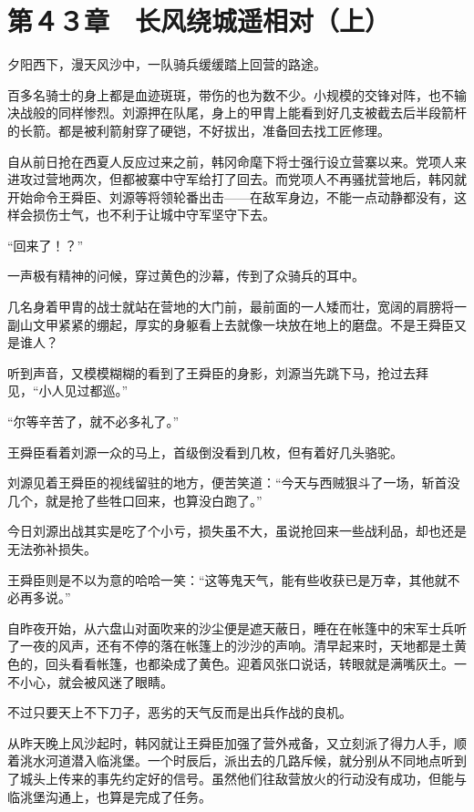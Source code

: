 \section{第４３章　长风绕城遥相对（上）}

夕阳西下，漫天风沙中，一队骑兵缓缓踏上回营的路途。

百多名骑士的身上都是血迹斑斑，带伤的也为数不少。小规模的交锋对阵，也不输决战般的同样惨烈。刘源押在队尾，身上的甲胄上能看到好几支被截去后半段箭杆的长箭。都是被利箭射穿了硬铠，不好拔出，准备回去找工匠修理。

自从前日抢在西夏人反应过来之前，韩冈命麾下将士强行设立营寨以来。党项人来进攻过营地两次，但都被寨中守军给打了回去。而党项人不再骚扰营地后，韩冈就开始命令王舜臣、刘源等将领轮番出击——在敌军身边，不能一点动静都没有，这样会损伤士气，也不利于让城中守军坚守下去。

“回来了！？”

一声极有精神的问候，穿过黄色的沙幕，传到了众骑兵的耳中。

几名身着甲胄的战士就站在营地的大门前，最前面的一人矮而壮，宽阔的肩膀将一副山文甲紧紧的绷起，厚实的身躯看上去就像一块放在地上的磨盘。不是王舜臣又是谁人？

听到声音，又模模糊糊的看到了王舜臣的身影，刘源当先跳下马，抢过去拜见，“小人见过都巡。”

“尔等辛苦了，就不必多礼了。”

王舜臣看着刘源一众的马上，首级倒没看到几枚，但有着好几头骆驼。

刘源见着王舜臣的视线留驻的地方，便苦笑道：“今天与西贼狠斗了一场，斩首没几个，就是抢了些牲口回来，也算没白跑了。”

今日刘源出战其实是吃了个小亏，损失虽不大，虽说抢回来一些战利品，却也还是无法弥补损失。

王舜臣则是不以为意的哈哈一笑：“这等鬼天气，能有些收获已是万幸，其他就不必再多说。”

自昨夜开始，从六盘山对面吹来的沙尘便是遮天蔽日，睡在在帐篷中的宋军士兵听了一夜的风声，还有不停的落在帐篷上的沙沙的声响。清早起来时，天地都是土黄色的，回头看看帐篷，也都染成了黄色。迎着风张口说话，转眼就是满嘴灰土。一不小心，就会被风迷了眼睛。

不过只要天上不下刀子，恶劣的天气反而是出兵作战的良机。

从昨天晚上风沙起时，韩冈就让王舜臣加强了营外戒备，又立刻派了得力人手，顺着洮水河道潜入临洮堡。一个时辰后，派出去的几路斥候，就分别从不同地点听到了城头上传来的事先约定好的信号。虽然他们往敌营放火的行动没有成功，但能与临洮堡沟通上，也算是完成了任务。


